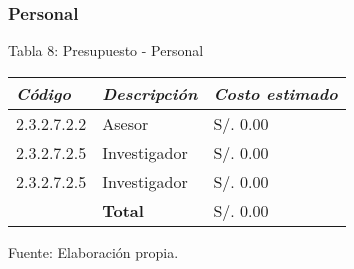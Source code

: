     \subsubsection{Personal}
        \begin{table}[h!]
            \centering
            { Tabla 8: Presupuesto - Personal}\par
            \begin{tabular}{|p{3cm}|p{3cm}|p{3cm}|} \hline
                 
            
            \textit{{\bf{Código}}} &
            \textit{{\bf{Descripción}}} &
            \textit{{\bf{Costo estimado}}}
            \\ \hline

            2.3.2.7.2.2 &
            Asesor &
            S/. 0.00
            \\ \hline

            2.3.2.7.2.5 &
            Investigador &
            S/. 0.00
            \\ \hline

            2.3.2.7.2.5 &
            Investigador &
            S/. 0.00
            \\ \hline

             &
            \bf{Total} &
            S/. 0.00
            \\ \hline

                
            \end{tabular}
            \begin{center}
                    \vskip -0.2cm
                    {\small{Fuente: Elaboración propia.}}
                \end{center}
        \end{table}

\newpage

